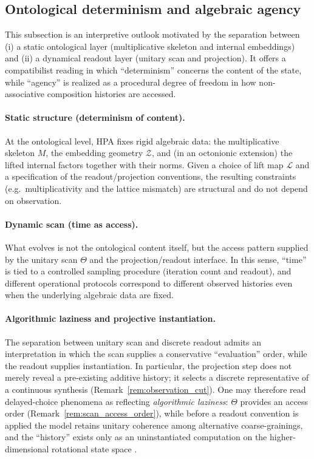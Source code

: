 \subsection{Ontological determinism and algebraic agency}
\label{subsec:algebraic_agency}
This subsection is an interpretive outlook motivated by the separation between (i) a static ontological layer (multiplicative skeleton and internal embeddings) and (ii) a dynamical readout layer (unitary scan and projection).
It offers a compatibilist reading in which ``determinism'' concerns the content of the state, while ``agency'' is realized as a procedural degree of freedom in how non-associative composition histories are accessed.

\paragraph{Static structure (determinism of content).}
At the ontological level, HPA fixes rigid algebraic data: the multiplicative skeleton $M$, the embedding geometry $\mathcal{Z}$, and (in an octonionic extension) the lifted internal factors together with their norms.
Given a choice of lift map $\mathcal{L}$ and a specification of the readout/projection conventions, the resulting constraints (e.g.\ multiplicativity and the lattice mismatch) are structural and do not depend on observation.

\paragraph{Dynamic scan (time as access).}
What evolves is not the ontological content itself, but the access pattern supplied by the unitary scan $\Theta$ and the projection/readout interface.
In this sense, ``time'' is tied to a controlled sampling procedure (iteration count and readout), and different operational protocols correspond to different observed histories even when the underlying algebraic data are fixed.

\paragraph{Algorithmic laziness and projective instantiation.}
The separation between unitary scan and discrete readout admits an interpretation in which the scan supplies a conservative ``evaluation'' order, while the readout supplies instantiation.
In particular, the projection step does not merely reveal a pre-existing additive history; it selects a discrete representative of a continuous synthesis (Remark~\ref{rem:observation_cut}).
One may therefore read delayed-choice phenomena as reflecting \emph{algorithmic laziness}: $\Theta$ provides an access order (Remark~\ref{rem:scan_access_order}), while before a readout convention is applied the model retains unitary coherence among alternative coarse-grainings, and the ``history'' exists only as an uninstantiated computation on the higher-dimensional rotational state space \cite{WheelerZurek1983}.


